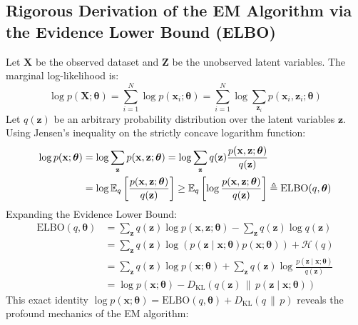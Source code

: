 \subsection{Rigorous Derivation of the EM Algorithm via the Evidence Lower Bound (ELBO)}
Let $\mathbf{X}$ be the observed dataset and $\mathbf{Z}$ be the unobserved latent variables. The marginal log-likelihood is:
\begin{equation}
\log p(\mathbf{X}; \boldsymbol{\theta}) = \sum_{i=1}^N \log p(\mathbf{x}_i; \boldsymbol{\theta}) = \sum_{i=1}^N \log \sum_{\mathbf{z}_i} p(\mathbf{x}_i, \mathbf{z}_i; \boldsymbol{\theta})
\end{equation}
Let $q(\mathbf{z})$ be an arbitrary probability distribution over the latent variables $\mathbf{z}$.
Using Jensen's inequality on the strictly concave logarithm function:
\begin{align}
\log p(\mathbf{x}; \boldsymbol{\theta}) &= \log \sum_{\mathbf{z}} p(\mathbf{x}, \mathbf{z}; \boldsymbol{\theta}) = \log \sum_{\mathbf{z}} q(\mathbf{z}) \frac{p(\mathbf{x}, \mathbf{z}; \boldsymbol{\theta})}{q(\mathbf{z})} \nonumber \\
&= \log \operatorname{\mathbb{E}}_{q} \left[ \frac{p(\mathbf{x}, \mathbf{z}; \boldsymbol{\theta})}{q(\mathbf{z})} \right] \ge \operatorname{\mathbb{E}}_{q} \left[ \log \frac{p(\mathbf{x}, \mathbf{z}; \boldsymbol{\theta})}{q(\mathbf{z})} \right] \triangleq \text{ELBO}(q, \boldsymbol{\theta})
\label{eq:elbo_jensen}
\end{align}
Expanding the Evidence Lower Bound:
\begin{align}
\text{ELBO}(q, \boldsymbol{\theta}) &= \sum_{\mathbf{z}} q(\mathbf{z}) \log p(\mathbf{x}, \mathbf{z}; \boldsymbol{\theta}) - \sum_{\mathbf{z}} q(\mathbf{z}) \log q(\mathbf{z}) \nonumber \\
&= \sum_{\mathbf{z}} q(\mathbf{z}) \log \left( p(\mathbf{z} \mid \mathbf{x}; \boldsymbol{\theta}) p(\mathbf{x}; \boldsymbol{\theta}) \right) + \mathcal{H}(q) \nonumber \\
&= \sum_{\mathbf{z}} q(\mathbf{z}) \log p(\mathbf{x}; \boldsymbol{\theta}) + \sum_{\mathbf{z}} q(\mathbf{z}) \log\frac{p(\mathbf{z} \mid \mathbf{x}; \boldsymbol{\theta})}{q(\mathbf{z})} \nonumber \\
&= \log p(\mathbf{x}; \boldsymbol{\theta}) - D_{\text{KL}}\left( q(\mathbf{z}) \,\big\|\, p(\mathbf{z} \mid \mathbf{x}; \boldsymbol{\theta}) \right)
\label{eq:elbo_decomp}
\end{align}
This exact identity $\log p(\mathbf{x}; \boldsymbol{\theta}) = \text{ELBO}(q, \boldsymbol{\theta}) + D_{\text{KL}}(q \,\|\, p)$ reveals the profound mechanics of the EM algorithm:
